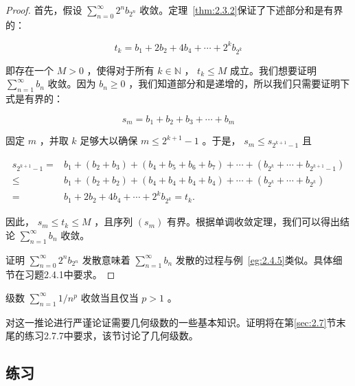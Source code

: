 \begin{proof}
首先，假设 \(\mathop{\sum }\limits_{{n = 0}}^{\infty }{2}^{n}{b}_{{2}^{n}}\) 收敛。定理~\ref{thm:2.3.2}保证了下述部分和是有界的：

\[
{t}_{k} = {b}_{1} + 2{b}_{2} + 4{b}_{4} + \cdots  + {2}^{k}{b}_{{2}^{k}}
\]

即存在一个 \(M > 0\) ，使得对于所有 \(k \in  \mathbb{N}\) ， \({t}_{k} \leq  M\) 成立。我们想要证明 \(\mathop{\sum }\limits_{{n = 1}}^{\infty }{b}_{n}\) 收敛。因为 \({b}_{n} \geq  0\) ，我们知道部分和是递增的，所以我们只需要证明下式是有界的：

\[
{s}_{m} = {b}_{1} + {b}_{2} + {b}_{3} + \cdots  + {b}_{m}
\]

固定 \(m\) ，并取 \(k\) 足够大以确保 \(m \leq  {2}^{k + 1} - 1\) 。于是， \({s}_{m} \leq  {s}_{{2}^{k + 1} - 1}\) 且

\begin{align*}
{s}_{{2}^{k + 1} - 1} = & {b}_{1} + \left( {{b}_{2} + {b}_{3}}\right)  + \left( {{b}_{4} + {b}_{5} + {b}_{6} + {b}_{7}}\right)  + \cdots  + \left( {{b}_{{2}^{k}} + \cdots  + {b}_{{2}^{k + 1} - 1}}\right)\\
\leq & {b}_{1} + \left( {{b}_{2} + {b}_{2}}\right)  + \left( {{b}_{4} + {b}_{4} + {b}_{4} + {b}_{4}}\right)  + \cdots  + \left( {{b}_{{2}^{k}} + \cdots  + {b}_{{2}^{k}}}\right)\\
= & {b}_{1} + 2{b}_{2} + 4{b}_{4} + \cdots  + {2}^{k}{b}_{{2}^{k}} = {t}_{k}.
\end{align*}


因此， \({s}_{m} \leq  {t}_{k} \leq  M\) ，且序列 \(\left( {s}_{m}\right)\) 有界。根据单调收敛定理，我们可以得出结论 \(\mathop{\sum }\limits_{{n = 1}}^{\infty }{b}_{n}\) 收敛。
  
证明 \(\mathop{\sum }\limits_{{n = 0}}^{\infty }{2}^{n}{b}_{{2}^{n}}\) 发散意味着 \(\mathop{\sum }\limits_{{n = 1}}^{\infty }{b}_{n}\) 发散的过程与例~\ref{eg:2.4.5}类似。具体细节在习题2.4.1中要求。
\end{proof}




\begin{Cor}
  \label{cor:2.4.7}
  级数 \(\mathop{\sum }\limits_{{n = 1}}^{\infty }1/{n}^{p}\) 收敛当且仅当 \(p > 1\) 。
\end{Cor}

对这一推论进行严谨论证需要几何级数的一些基本知识。证明将在第\ref{sec:2.7}节末尾的练习2.7.7中要求，该节讨论了几何级数。

\subsection{练习}


